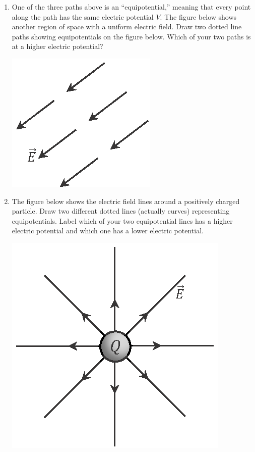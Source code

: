 \begin{enumerate}[labparts]
\item  One of the three paths  above is an ``equipotential,'' meaning that every point along the path has the same electric potential $V$.  The figure below shows another region of space with a uniform electric field.  Draw two dotted line paths showing equipotentials on the figure below.  Which of your two paths is at a higher electric potential?

\begin{center}
\vspace{-0.25 in}
\includegraphics{potential_intro/activity_5_figs/uniform_E_field_2_squish.eps}
\end{center}

\item The figure below shows the electric field lines around a positively charged particle.  Draw two different dotted lines (actually curves) representing equipotentials.  Label which of your two equipotential lines has a higher electric potential and which one has a lower electric potential. 
\begin{center}
\vspace{-0.1 in}
\includegraphics{potential_intro/activity_5_figs/point_charge_E_field.eps}
\end{center}


\end{enumerate}
